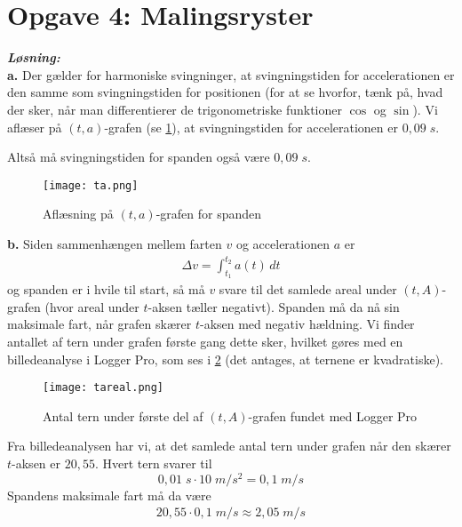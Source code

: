 \documentclass{report}
\newcommand{\sol}{\setlength{\parindent}{0cm}\textbf{\textit{Løsning:}}\setlength{\parindent}{1cm}}
\begin{document}
\section*{Opgave 4: Malingsryster}
\sol \\
\textbf{a.}
Der gælder for harmoniske svingninger, at svingningstiden for accelerationen er den samme som svingningstiden for positionen (for at se hvorfor, tænk på, hvad der sker, når man differentierer de trigonometriske funktioner $\cos$ og $\sin$).
Vi aflæser på $(t,a)$-grafen (se \cref{fig:ta}), at svingningstiden for accelerationen er $0,09 \;\unit{s} $.

Altså må svingningstiden for spanden også være $0,09 \;\unit{s} $.
\begin{figure}[H]
\begin{center}
  \texttt{[image: ta.png]}
\end{center}
  \caption{Aflæsning på $(t,a)$-grafen for spanden}
\label{fig:ta}
\end{figure}
\noindent \textbf{b.}
Siden sammenhængen mellem farten $v$ og accelerationen $a$ er 
\begin{equation*}
\begin{split}
  \Delta v = \int_{t_1}^{t_2} a(t) \,dt 
\end{split}
\end{equation*}
og spanden er i hvile til start, så må $v$ svare til det samlede areal under $(t,A)$-grafen (hvor areal under $t$-aksen tæller negativt).
Spanden må da nå sin maksimale fart, når grafen skærer $t$-aksen med negativ hældning.
Vi finder antallet af tern under grafen første gang dette sker, hvilket gøres med en billedeanalyse i Logger Pro, som ses i \cref{fig:tareal} (det antages, at ternene er kvadratiske).
\begin{figure}[H]
\begin{center}
  \texttt{[image: tareal.png]}
\end{center}
\caption{Antal tern under første del af $(t,A)$-grafen fundet med Logger Pro}
\label{fig:tareal}
\end{figure}
Fra billedeanalysen har vi, at det samlede antal tern under grafen når den skærer $t$-aksen er $20,55$.
Hvert tern svarer til
\[
0,01 \;\unit{s}  \cdot 10 \;\unit{m/s^2} =0,1 \;\unit{m/s} 
\] 
Spandens maksimale fart må da være
\begin{equation*}
\begin{split}
20,55 \cdot 0,1 \;\unit{m/s} \approx 2,05 \;\unit{m/s} 
\end{split}
\end{equation*}
\end{document}
